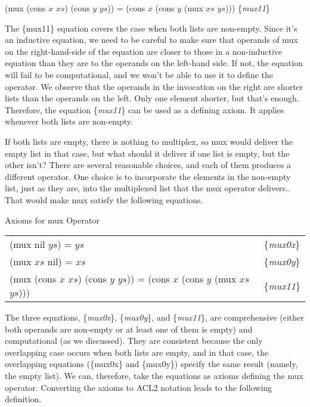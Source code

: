 \hspace{1cm} (mux (cons $x$ $xs$) (cons $y$ $ys$)) = (cons $x$ (cons $y$ (mux $xs$ $ys$)))
\hfill \{\emph{mux11}\}

The \{mux11\} equation covers the case when both lists are non-empty.
Since it's an inductive equation, we need to be careful to make sure
that operands of mux on the right-hand-side of the equation
are closer to those in a non-inductive equation than they are
to the operands on the left-hand side.
If not, the equation will fail to be computational, and
we won't be able to use it to define the operator.
We observe that the operands in the invocation on the
right are shorter lists than the operands on the left.
Only one element shorter, but that's enough.
Therefore, the equation \{\emph{mux11}\} can be used
as a defining axiom. It applies whenever both lists are non-empty.

If both lists are empty, there is nothing to multiplex,
so mux would deliver the empty list in that case, but
what should it deliver if one list is empty, but the other isn't?
There are several reasonable choices, and each of them produces
a different operator. One choice is to incorporate the elements
in the non-empty list, just as they are, into the
multiplexed list that the mux operator delivers..
That would make mux satisfy the following equations.

\begin{center}
Axioms for mux Operator\label{axioms:mux}
\begin{tabular}{ll}
(mux nil $ys$) = $ys$  & \{\emph{mux0x}\}     \\
(mux $xs$ nil) = $xs$  & \{\emph{mux0y}\}     \\
(mux (cons $x$ $xs$) (cons $y$ $ys$)) = (cons $x$ (cons $y$ (mux $xs$ $ys$))) & \{\emph{mux11}\} \\
\end{tabular}
\end{center}

\label{def:mux}
The three equations, \{\emph{mux0x}\}, \{\emph{mux0y}\}, and \{\emph{mux11}\},
are comprehensive (either both operands are non-empty
or at least one of them is empty) and computational (as we discussed).
They are consistent because the only overlapping case
occurs when both lists are empty, and in that case,
the overlapping equations
(\{mux0x\} and \{mux0y\}) specify the same result
(namely, the empty list).
We can, therefore, take the equations as axioms
defining the mux operator.
Converting the axioms to ACL2 notation leads to the following
definition.

